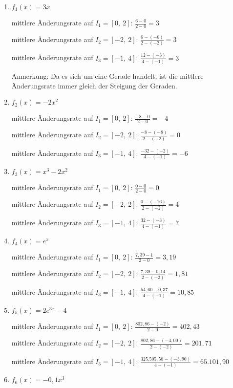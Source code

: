 \begin{Answer}[ref=aenderungsrateA2]
	\begin{enumerate}[label=\alph*)]
		\item \(f_1(x)=3x\)

		mittlere Änderungsrate auf \(I_1=[0,\ 2]\): \(\frac{6-0}{2-0}=3\)

		mittlere Änderungsrate auf \(I_2=[-2,\ 2]\): \(\frac{6-(-6)}{2-(-2)}=3\)

		mittlere Änderungsrate auf \(I_3=[-1,\ 4]\): \(\frac{12-(-3)}{4-(-1)}=3\)

		Anmerkung: Da es sich um eine Gerade handelt, ist die mittlere Änderungsrate immer gleich der Steigung der Geraden.
		\item \(f_2(x)=-2x^2\)

		mittlere Änderungsrate auf \(I_1=[0,\ 2]\): \(\frac{-8-0}{2-0}=-4\)

		mittlere Änderungsrate auf \(I_2=[-2,\ 2]\): \(\frac{-8-(-8)}{2-(-2)}=0\)

		mittlere Änderungsrate auf \(I_3=[-1,\ 4]\): \(\frac{-32-(-2)}{4-(-1)}=-6\)

		\item \(f_3(x)=x^3-2x^2\)

		mittlere Änderungsrate auf \(I_1=[0,\ 2]\): \(\frac{0-0}{2-0}=0\)

		mittlere Änderungsrate auf \(I_2=[-2,\ 2]\): \(\frac{0-(-16)}{2-(-2)}=4\)

		mittlere Änderungsrate auf \(I_3=[-1,\ 4]\): \(\frac{32-(-3)}{4-(-1)}=7\)

		\item \(f_4(x)=e^x\)

		mittlere Änderungsrate auf \(I_1=[0,\ 2]\): \(\frac{7,39-1}{2-0}=3,19\)

		mittlere Änderungsrate auf \(I_2=[-2,\ 2]\): \(\frac{7,39-0,14}{2-(-2)}=1,81\)

		mittlere Änderungsrate auf \(I_3=[-1,\ 4]\): \(\frac{54,60-0,37}{4-(-1)}=10,85\)

		\item \(f_5(x)=2e^{3x}-4\)

		mittlere Änderungsrate auf \(I_1=[0,\ 2]\): \(\frac{802,86-(-2)}{2-0}=402,43\)

		mittlere Änderungsrate auf \(I_2=[-2,\ 2]\): \(\frac{802,86-(-4,00)}{2-(-2)}=201,71\)

		mittlere Änderungsrate auf \(I_3=[-1,\ 4]\): \(\frac{325.505,58-(-3,90)}{4-(-1)}=65.101,90\)

		\item \(f_6(x)=-0,1x^3\)


\end{enumerate}
\end{Answer}
